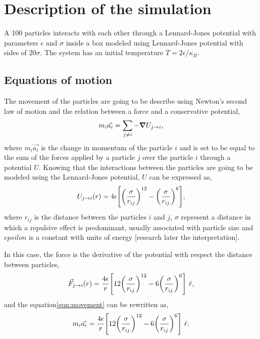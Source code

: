 \documentclass[main.tex]{subfiles}
\begin{document}
\section{Description of the simulation}

A 100 particles interacts with each other through a Lennard-Jones potential with parameters $\epsilon$ and $\sigma$ inside a box modeled using Lennard-Jones potential with sides of $20\sigma$.
The system has an initial temperature $T=2\epsilon/\kappa_{B}$.

\subsection{Equations of motion}

The movement of the particles are going to be describe using Newton's second law of motion and the relation between a force and a conservative potential,
\begin{gather}
    m_{i}\vec{a_{i}} = \sum_{j\neq i}-\grad U_{j\to i}, \label{eqn:movement}
\end{gather}
where $m_{i}\vec{a_{i}}$ is the change in momentum of the particle $i$ and is set to be equal to the sum of the forces applied by a particle $j$ over the particle $i$ through a potential $U$.
Knowing that the interactions between the particles are going to be modeled using the Lennard-Jones potential, $U$ can be expressed as,
\begin{gather}
    U_{j\to i}\qty(r) = 4\epsilon\qty[\qty(\frac{\sigma}{r_{ij}})^{12} - \qty(\frac{\sigma}{r_{ij}})^{6}], \label{eqn:LJpotential}
\end{gather}
where $r_{ij}$ is the distance between the particles $i$ and $j$, $\sigma$ represent a distance in which a repulsive effect is predominant, usually associated with particle size and $epsilon$ is a constant with units of energy [research later the interpretation].

In this case, the force is the derivative of the potential with respect the distance between particles,
\begin{gather*}
    \vec{F}_{j\to i}\qty(r) = \frac{4\epsilon}{r}\qty[ 12\qty(\frac{\sigma}{r_{ij}})^{12} - 6\qty(\frac{\sigma}{r_{ij}})^{6} ]~\hat{r},
\end{gather*}
and the equation\eqref{eqn:movement} can be rewritten as, 
\begin{gather}
    m_{i}\vec{a_{i}} = \frac{4\epsilon}{r}\qty[ 12\qty(\frac{\sigma}{r_{ij}})^{12} - 6\qty(\frac{\sigma}{r_{ij}})^{6} ]~\hat{r}. \label{eqn:movementF}
\end{gather}
\end{document}
